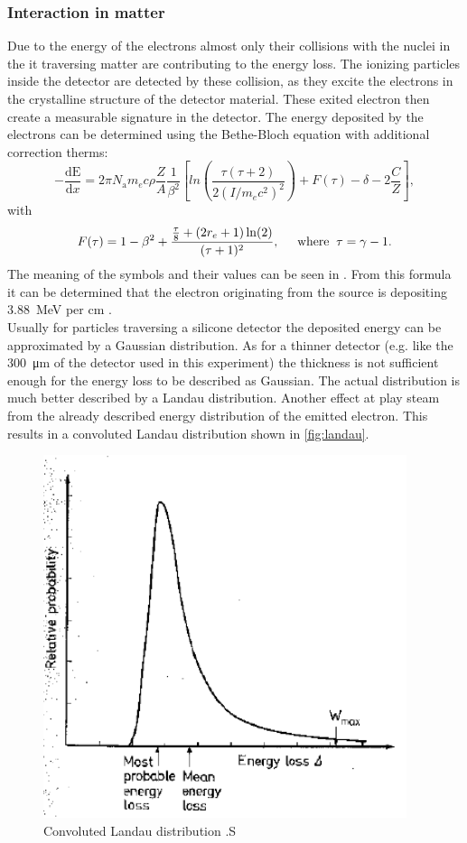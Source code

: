 \subsubsection{Interaction in matter}
Due to the energy of the electrons almost only their collisions with the nuclei in the it traversing matter are contributing to the energy loss. The ionizing particles inside the detector are detected by these collision, as they excite the electrons in the crystalline structure of the detector material. These exited electron then create a measurable signature in the detector. The energy deposited by the electrons can be determined using the Bethe-Bloch equation with additional correction therms:
\begin{equation}
	-\frac{\mathrm{dE}}{\mathrm{d}x} = 2\pi N_{\mathrm{a}} m_e c \rho \frac{Z}{A} \frac{1}{\beta^2} \left[ln\left(\frac{\tau(\tau+2)}{2(I/m_ec^2)^2}\right)+F(\tau) - \delta - 2\frac{C}{Z}\right],
\end{equation}
with 
\begin{equation}
	F(\tau) = 1 - \beta^2 + \frac{\frac{\tau}{8}+(2r_e +1 )\ln(2)}{(\tau+1)^2}, \hspace{0.5cm} \mathrm{where}\hspace{0.2cm} \tau = \gamma-1.
\end{equation}
The meaning of the symbols and their values can be seen in \cite{lab}.
From this formula it can be determined that the electron originating from the  source is depositing \qty{3.88}{\mega\eV} per \unit{\centi\meter} \cite{lab}.\\

Usually for particles traversing a silicone detector the deposited energy can be approximated by a Gaussian distribution. As for a thinner detector (e.g. like the \qty{300}{\micro\meter} of the detector used in this experiment) the thickness is not sufficient enough for the energy loss to be described as Gaussian. The actual distribution is much better described by a Landau distribution. Another effect at play steam from the already described energy distribution of the emitted electron. This results in a convoluted Landau distribution shown in \autoref{fig:landau}.


\begin{figure}
	\centering
	\includegraphics[width=0.45\linewidth]{../Assets/landau}
	\caption{Convoluted Landau distribution \cite{lab}.S}
	\label{fig:landau}
\end{figure}



